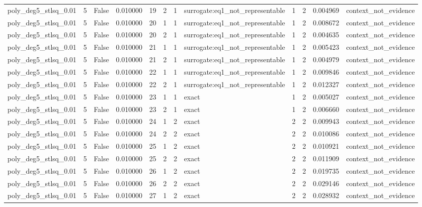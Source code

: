 \begin{tabular}{lrrrrrrlrrrl}
poly\_deg5\_stlsq\_0.01 & 5 & False & 0.010000 & 19 & 2 & 1 & surrogate:eq1\_not\_representable & 1 & 2 & 0.004969 & context\_not\_evidence \\
poly\_deg5\_stlsq\_0.01 & 5 & False & 0.010000 & 20 & 1 & 1 & surrogate:eq1\_not\_representable & 1 & 2 & 0.008672 & context\_not\_evidence \\
poly\_deg5\_stlsq\_0.01 & 5 & False & 0.010000 & 20 & 2 & 1 & surrogate:eq1\_not\_representable & 1 & 2 & 0.004635 & context\_not\_evidence \\
poly\_deg5\_stlsq\_0.01 & 5 & False & 0.010000 & 21 & 1 & 1 & surrogate:eq1\_not\_representable & 1 & 2 & 0.005423 & context\_not\_evidence \\
poly\_deg5\_stlsq\_0.01 & 5 & False & 0.010000 & 21 & 2 & 1 & surrogate:eq1\_not\_representable & 1 & 2 & 0.004979 & context\_not\_evidence \\
poly\_deg5\_stlsq\_0.01 & 5 & False & 0.010000 & 22 & 1 & 1 & surrogate:eq1\_not\_representable & 1 & 2 & 0.009846 & context\_not\_evidence \\
poly\_deg5\_stlsq\_0.01 & 5 & False & 0.010000 & 22 & 2 & 1 & surrogate:eq1\_not\_representable & 1 & 2 & 0.012327 & context\_not\_evidence \\
poly\_deg5\_stlsq\_0.01 & 5 & False & 0.010000 & 23 & 1 & 1 & exact & 1 & 2 & 0.005027 & context\_not\_evidence \\
poly\_deg5\_stlsq\_0.01 & 5 & False & 0.010000 & 23 & 2 & 1 & exact & 1 & 2 & 0.006660 & context\_not\_evidence \\
poly\_deg5\_stlsq\_0.01 & 5 & False & 0.010000 & 24 & 1 & 2 & exact & 2 & 2 & 0.009943 & context\_not\_evidence \\
poly\_deg5\_stlsq\_0.01 & 5 & False & 0.010000 & 24 & 2 & 2 & exact & 2 & 2 & 0.010086 & context\_not\_evidence \\
poly\_deg5\_stlsq\_0.01 & 5 & False & 0.010000 & 25 & 1 & 2 & exact & 2 & 2 & 0.010921 & context\_not\_evidence \\
poly\_deg5\_stlsq\_0.01 & 5 & False & 0.010000 & 25 & 2 & 2 & exact & 2 & 2 & 0.011909 & context\_not\_evidence \\
poly\_deg5\_stlsq\_0.01 & 5 & False & 0.010000 & 26 & 1 & 2 & exact & 2 & 2 & 0.019735 & context\_not\_evidence \\
poly\_deg5\_stlsq\_0.01 & 5 & False & 0.010000 & 26 & 2 & 2 & exact & 2 & 2 & 0.029146 & context\_not\_evidence \\
poly\_deg5\_stlsq\_0.01 & 5 & False & 0.010000 & 27 & 1 & 2 & exact & 2 & 2 & 0.028932 & context\_not\_evidence \\

\end{tabular}
